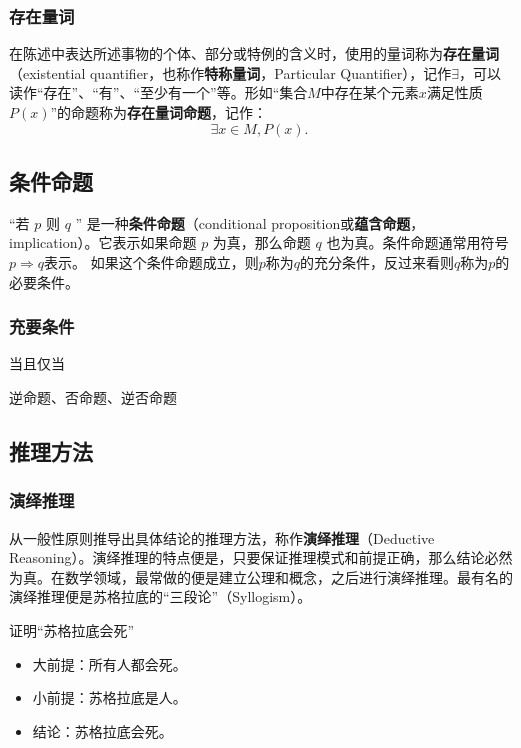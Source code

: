 \subsubsection{存在量词}

在陈述中表达所述事物的个体、部分或特例的含义时，使用的量词称为\textbf{存在量词}（existential quantifier，也称作\textbf{特称量词}，Particular Quantifier），记作$\exists$，可以读作“存在”、“有”、“至少有一个”等。形如“集合$M$中存在某个元素$x$满足性质$P(x)$”的命题称为\textbf{存在量词命题}，记作：
\begin{equation}
\exists x\in M,P(x).~
\end{equation}

\subsection{条件命题}
“若  $p$  则  $q$ ” 是一种\textbf{条件命题}（conditional proposition或\textbf{蕴含命题}，implication）。它表示如果命题  $p$  为真，那么命题  $q$  也为真。条件命题通常用符号$p\Rightarrow q$表示。
如果这个条件命题成立，则$p$称为$q$的充分条件，反过来看则$q$称为$p$的必要条件。

\subsubsection{充要条件}
当且仅当

逆命题、否命题、逆否命题

\subsection{推理方法}

\subsubsection{演绎推理}

从一般性原则推导出具体结论的推理方法，称作\textbf{演绎推理}（Deductive Reasoning）。演绎推理的特点便是，只要保证推理模式和前提正确，那么结论必然为真。在数学领域，最常做的便是建立公理和概念，之后进行演绎推理。最有名的演绎推理便是苏格拉底的“三段论”（Syllogism）。

\begin{example}{证明“苏格拉底会死”}
\begin{itemize}
\item 大前提：所有人都会死。
\item 小前提：苏格拉底是人。
\item 结论：苏格拉底会死。
\end{itemize}
\end{example}

